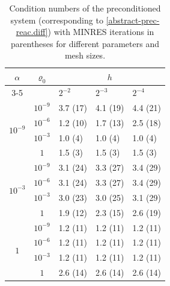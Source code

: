 \documentclass[11pt, reqno, a4paper, twoside]{article}
\numberwithin{equation}{section}
\numberwithin{remark}{section}
\numberwithin{figure}{section}
\numberwithin{table}{section}
\begin{document}
\begin{table}[t!]
\centering
{\footnotesize \begin{tabular}{|c | c | l l l|}
\hline
$\alpha$ & $\varrho_0$ & \multicolumn{3}{c|}{$h$} \\
\cline{3-5}
 & & $2^{-2}$ & $2^{-3}$ & $2^{-4}$ \\
\hline

\multirow{4}{*}{$10^{-9}$}
& $10^{-9}$ & 3.7 (17) & 4.1 (19) & 4.4 (21) \\
& $10^{-6}$ & 1.2 (10) & 1.7 (13) & 2.5 (18) \\
& $10^{-3}$ & 1.0 (4)  & 1.0 (4)  & 1.0 (4)  \\
& $1$       & 1.5 (3)  & 1.5 (3)  & 1.5 (3)  \\

\hline

\multirow{4}{*}{$10^{-3}$}
& $10^{-9}$ & 3.1 (24) & 3.3 (27) & 3.4 (29) \\
& $10^{-6}$ & 3.1 (24) & 3.3 (27) & 3.4 (29) \\
& $10^{-3}$ & 3.0 (23) & 3.0 (25) & 3.1 (29) \\
& $1$       & 1.9 (12) & 2.3 (15) & 2.6 (19) \\

\hline

\multirow{4}{*}{$1$}
& $10^{-9}$ & 1.2 (11) & 1.2 (11) & 1.2 (11) \\
& $10^{-6}$ & 1.2 (11) & 1.2 (11) & 1.2 (11) \\
& $10^{-3}$ & 1.2 (11) & 1.2 (11) & 1.2 (11) \\
& $1$       & 2.6 (14) & 2.6 (14) & 2.6 (14) \\

\hline
\end{tabular}}
\caption{Condition numbers of the preconditioned system (corresponding to \ref{abstract-prec-reac.diff}) with MINRES iterations in parentheses for different parameters and mesh sizes.}\label{tab:reac.diff}
\end{table}
\end{document}
